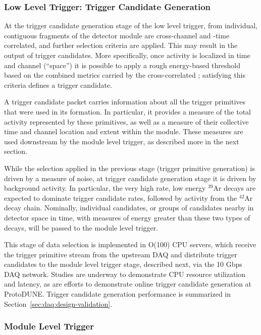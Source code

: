 \subsubsection{Low Level Trigger: Trigger Candidate Generation}

At the trigger candidate generation stage of the low level trigger,
 from individual, contiguous fragments of the detector
module are cross-channel and -time correlated, and further selection criteria
are applied.
This may result in the output of trigger candidates. 
More specifically, once activity is localized in time and channel (``space'') it
is possible to apply a rough energy-based threshold based on the combined
metrics carried by the cross-correlated ; satisfying this
criteria defines a trigger candidate. 

A trigger candidate packet carries information about all the trigger
primitives that were used in its formation. 
In particular, it provides a measure of the total activity represented
by these primitives, as well as a measure of their collective time and channel
location and extent within the module.
These measures are used downstream by the module level trigger, 
as described more in the next section.

While the selection applied in the previous stage (trigger primitive generation)
is driven by a measure of noise, at trigger candidate generation stage it is
driven by background activity.  
In particular, the very high rate, low energy $^{39}$Ar decays are expected to
dominate trigger candidate rates, followed by activity from the $^{42}$Ar decay
chain.
Nominally, individual candidates, or groups of candidates nearby in detector
space in time, with measures of energy greater than these two types of decays,
will be passed to the module level trigger. 

This stage of data selection is implemented in O(100) CPU servers, which receive
the trigger primitive stream from the upstream DAQ and distribute trigger
candidates to the module level trigger stage, described next, via the 10 Gbps
DAQ network.
Studies are underway to demonstrate CPU resource utilization and latency, as are
efforts to demonstrate online trigger candidate generation at
ProtoDUNE.
Trigger candidate generation performance is summarized in
Section~\ref{sec:daq:design-validation}. 


\subsubsection{Module Level Trigger}

